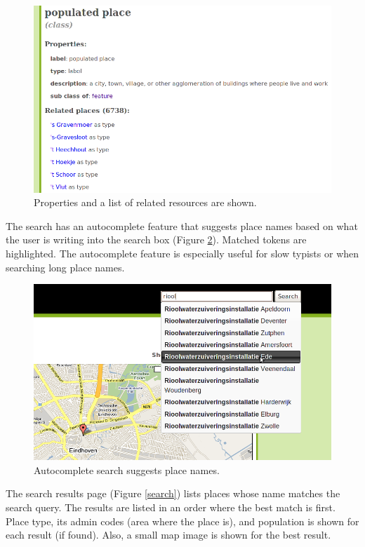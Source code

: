 \documentclass[a4paper,12pt]{article}
\begin{document}
\begin{figure}[h]
  \includegraphics[width=\linewidth]{img/recommendations.png}
  \caption{Properties and a list of related resources are shown.}
  \label{recommendations}
\end{figure}

\noindent The search has an autocomplete feature that suggests place
names based on what the user is writing into the search box (Figure
\ref{autocomplete}). Matched tokens are highlighted. The autocomplete
feature is especially useful for slow typists or when searching long
place names.

\begin{figure}[h]
  \includegraphics[width=\linewidth]{img/autocomplete.png}
  \caption{Autocomplete search suggests place names.}
  \label{autocomplete}
\end{figure}

The search results page (Figure \ref{search}) lists places whose name
matches the search query. The results are listed in an order where the
best match is first. Place type, its admin codes (area where the place
is), and population is shown for each result (if found). Also, a small
map image is shown for the best result.
\end{document}
